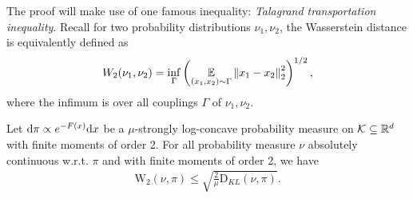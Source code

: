 The proof will make use of one famous inequality: \emph{Talagrand transportation inequality}.
Recall for two probability distributions $\nu_1,\nu_2$, the Wasserstein distance is equivalently defined as $$W_2(\nu_1,\nu_2)=\inf_\Gamma \left(\operatorname*{\mathbb{E}}_{(x_1,x_2)\sim \Gamma} \left\lVert x_1-x_2\right\rVert_2^2\right)^{1/2},$$ where the infimum is over all couplings $\Gamma$ of $\nu_1,\nu_2.$
\begin{theorem}{\cite[Theorem 1]{OV00}}
\label{thm:TTI}
Let $\mathrm{d}\pi\propto e^{-F(x)}\mathrm{d} x$ be a $\mu$-strongly log-concave probability measure on $\mathcal K\subseteq\mathbb{R}^d$ with finite moments of order 2. 
For all probability measure $\nu$ absolutely continuous w.r.t. $\pi$ and with finite moments of order 2,
we have
\begin{align*}
\mathrm{W}_2(\nu,\pi)\leq\sqrt{\frac{2}{\mu}\mathrm{D}_{KL}(\nu,\pi)}.   
\end{align*}
\end{theorem}






